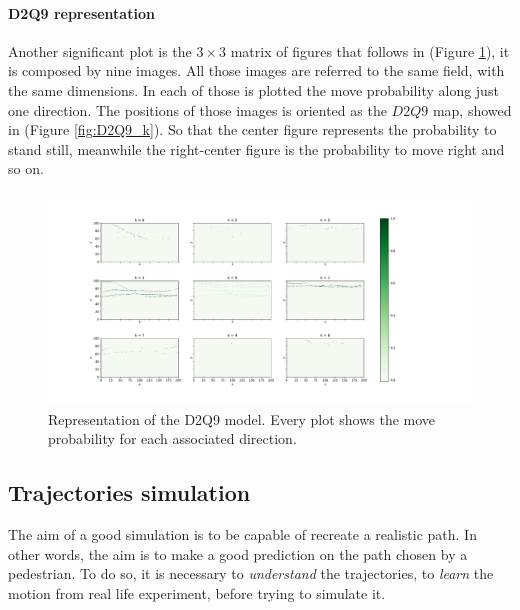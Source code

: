 \documentclass[class=article, crop=false]{standalone}
\begin{document}
\paragraph{D2Q9 representation}
Another significant plot is the $3\times3$ matrix of figures that follows in (Figure \ref{fig:5pids_D2Q9}), it is composed by nine images.
All those images are referred to the same field, with the same dimensions.
In each of those is plotted the move probability along just one direction.
The positions of those images is oriented as the $D2Q9$ map, showed in (Figure \ref{fig:D2Q9_k}).
So that the center figure represents the probability to stand still, meanwhile the right-center figure is the probability to move right and so on.
\begin{figure}[h]
\centering
\includegraphics[scale=0.35]{fig/5pids/figure_trainf10_few_trajectories_Dx200_Dy100_D2Q9}
\captionsetup{width=.6\linewidth}
\caption{Representation of the D2Q9 model. Every plot shows the move probability for each associated direction.}
\label{fig:5pids_D2Q9}
\end{figure}




\FloatBarrier
\subsection{Trajectories simulation}
The aim of a good simulation is to be capable of recreate a realistic path.
In other words, the aim is to make a good prediction on the path chosen by a pedestrian.
To do so, it is necessary to \emph{understand} the trajectories, to \emph{learn} the motion from real life experiment, before trying to simulate it.
\end{document}
